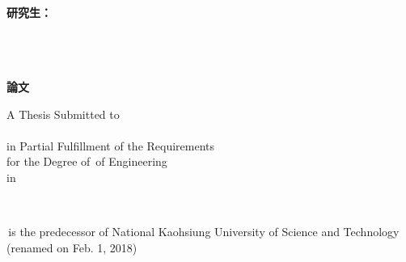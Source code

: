 
\begin{titlepage}
\vspace*{1mm}

\begin{center}

{\LARGE\bfseries  \titletw}\\
\vspace{15mm}
{\LARGE  \titleen}
\vspace{15mm}

{ \large\bfseries {研究生：} \large\authortwname \\
     \large\supervisortwname \\
    \makebox [25mm][l]{ \large\bfseries { }} 
    \ifdefempty{\cosupervisortwname}{}{\large\cosupervisortwname } }

\vspace{7mm}
{\Large\bfseries{\schooltwname}\\
\vspace{4.5mm}
\Large\bfseries{}\\
\vspace{4.5mm}
\Large\bfseries \degreetw 論文}\\
\vspace{10mm}

\vspace{4.5mm}
A Thesis Submitted to \deptenname\\
\schoolenname\\
in Partial Fulfillment of the Requirements\\
for the Degree of \degreeen \,of Engineering\\
in \majortwname

\vspace{15mm}
\dateen\\
\schoolenlocation

\vspace{10mm}
\schoolenoldname \,is the predecessor of
National Kaohsiung University of
Science and Technology (renamed on Feb. 1, 2018)

\vspace{10mm}
\fontsize{14pt}{0pt}{\bfseries{\dateROC }}

\end{center}

\end{titlepage} 